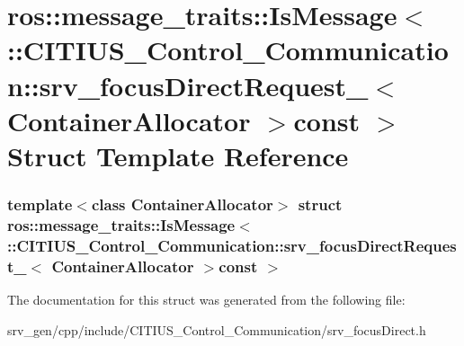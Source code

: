\hypertarget{structros_1_1message__traits_1_1_is_message_3_01_1_1_c_i_t_i_u_s___control___communication_1_1sr8052bc3166efef414ec9074d2024be73}{\section{ros\-:\-:message\-\_\-traits\-:\-:\-Is\-Message$<$ \-:\-:\-C\-I\-T\-I\-U\-S\-\_\-\-Control\-\_\-\-Communication\-:\-:srv\-\_\-focus\-Direct\-Request\-\_\-$<$ \-Container\-Allocator $>$const $>$ \-Struct \-Template \-Reference}
\label{structros_1_1message__traits_1_1_is_message_3_01_1_1_c_i_t_i_u_s___control___communication_1_1sr8052bc3166efef414ec9074d2024be73}
}
\subsubsection*{template$<$class Container\-Allocator$>$ struct ros\-::message\-\_\-traits\-::\-Is\-Message$<$ \-::\-C\-I\-T\-I\-U\-S\-\_\-\-Control\-\_\-\-Communication\-::srv\-\_\-focus\-Direct\-Request\-\_\-$<$ Container\-Allocator $>$const  $>$}



\-The documentation for this struct was generated from the following file\-:\begin{DoxyCompactItemize}
\item 
srv\-\_\-gen/cpp/include/\-C\-I\-T\-I\-U\-S\-\_\-\-Control\-\_\-\-Communication/srv\-\_\-focus\-Direct.\-h\end{DoxyCompactItemize}

